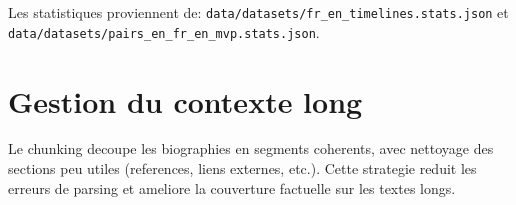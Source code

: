 Les statistiques proviennent de:
\texttt{data/datasets/fr\_en\_timelines.stats.json} et
\texttt{data/datasets/pairs\_en\_fr\_en\_mvp.stats.json}.

\section{Gestion du contexte long}
Le chunking decoupe les biographies en segments coherents, avec nettoyage des
sections peu utiles (references, liens externes, etc.). Cette strategie reduit
les erreurs de parsing et ameliore la couverture factuelle sur les textes longs.
